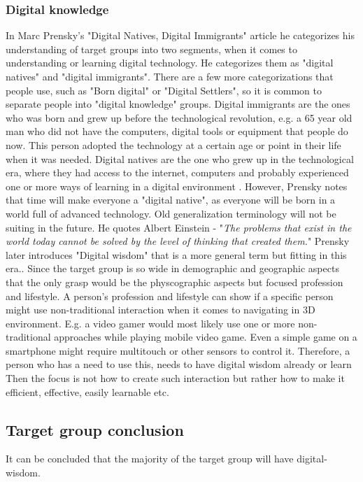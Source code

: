 \subsubsection{Digital knowledge}
In Marc Prensky's "Digital Natives, Digital Immigrants" \cite{DigitalImmigrants} article he categorizes his understanding of target groups into two segments, when it comes to understanding or learning digital technology. He categorizes them as "digital natives" and "digital immigrants". There are a few more categorizations that people use, such as "Born digital" or "Digital Settlers", so it is common to separate people into "digital knowledge" groups.
Digital immigrants are the ones who was born and grew up before the technological revolution, e.g. a 65 year old man who did not have the computers, digital tools or equipment that people do now. This person adopted the technology at a certain age or point in their life when it was needed. 
Digital natives are the one who grew up in the technological era, where they had access to the internet, computers and probably experienced one or more ways of learning in a digital environment \cite{DigitalImmigrants}. However, Prensky notes that time will make everyone a "digital native", as everyone will be born in a world full of advanced technology. Old generalization terminology will not be suiting in the future. He quotes Albert Einstein - "\textit{The problems that exist in the world today cannot be solved by the level of thinking that created them.}" Prensky later introduces "Digital wisdom" that is a more general term but fitting in this era.\cite{DigitaIWisdom}. Since the target group is so wide in demographic and geographic aspects that the only grasp  would be the physcographic aspects but focused profession and lifestyle. A person's profession and lifestyle can show if a specific person might use non-traditional interaction when it comes to navigating in 3D environment. E.g. a video gamer would most likely use one or more non-traditional approaches while playing mobile video game. Even a simple game on a smartphone might require multitouch or other sensors to control it.  
Therefore, a person who has a need to use this, needs to have digital wisdom already or learn  Then the focus is not how to create such interaction but rather how to make it efficient, effective, easily learnable etc. %

\subsection{Target group conclusion}
It can be concluded that the majority of the target group will have digital-wisdom.